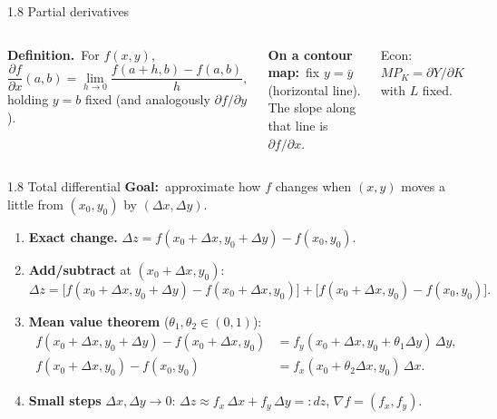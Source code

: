 \documentclass[11pt,aspectratio=169]{beamer}
\begin{document}
\begin{frame}{1.8 Partial derivatives}
  \footnotesize
  \begin{columns}[T,onlytextwidth]
    \textbf{Definition.}\ For $f(x,y)$,
    \[
      \frac{\partial f}{\partial x}(a,b)
      =\lim_{h\to 0}\frac{f(a+h,b)-f(a,b)}{h},
    \]
    holding $y=b$ fixed (and analogously $\partial f/\partial y$).

    \medskip
    \textbf{On a contour map:}\ fix $y=\bar y$ (horizontal line).
    The slope along that line is $\partial f/\partial x$.

    \medskip
    {\scriptsize Econ: $MP_K=\partial Y/\partial K$ with $L$ fixed.}

    \centering
  \end{columns}
\end{frame}

\begin{frame}{1.8 Total differential}
  \vspace{-0.15cm}
  \small
  \setlength{\abovedisplayskip}{6pt}
  \setlength{\belowdisplayskip}{6pt}
  \textbf{Goal:}\ approximate how $f$ changes when $(x,y)$ moves a little
  from $(x_0,y_0)$ by $(\Delta x,\Delta y)$.

  \vspace{0.2cm}
  \setlength{\itemsep}{7pt}
  \begin{enumerate}
    \item \textbf{Exact change.}
      $\Delta z=f(x_0+\Delta x,y_0+\Delta y)-f(x_0,y_0)$.

    \item \textbf{Add/subtract} at $(x_0+\Delta x,y_0)$:
      \[
        \Delta z=
        \bigl[f(x_0+\Delta x,y_0+\Delta y)-f(x_0+\Delta x,y_0)\bigr]
        +\bigl[f(x_0+\Delta x,y_0)-f(x_0,y_0)\bigr].
      \]

    \item \textbf{Mean value theorem} ($\theta_1,\theta_2\in(0,1)$):
      \[
        \begin{aligned}
          f(x_0+\Delta x,y_0+\Delta y)-f(x_0+\Delta x,y_0)
          &=f_y(x_0+\Delta x,y_0+\theta_1\Delta y)\,\Delta y,\\
          f(x_0+\Delta x,y_0)-f(x_0,y_0)
          &=f_x(x_0+\theta_2\Delta x,y_0)\,\Delta x.
        \end{aligned}
      \]

    \item \textbf{Small steps} $\Delta x,\Delta y\to 0$:
      $\Delta z\approx f_x\,\Delta x+f_y\,\Delta y=:dz$,
      \quad $\nabla f=(f_x,f_y)$.
  \end{enumerate}
\end{frame}
\end{document}

